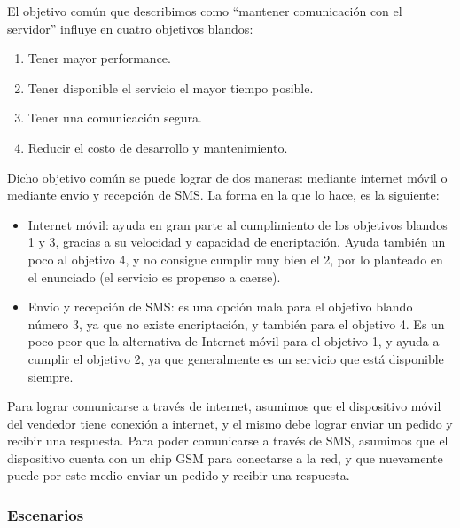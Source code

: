 \indent El objetivo común que describimos como ``mantener comunicación con el servidor'' influye en cuatro objetivos blandos:
\begin{enumerate}
  \item Tener mayor performance.
  \item Tener disponible el servicio el mayor tiempo posible.
  \item Tener una comunicación segura.
  \item Reducir el costo de desarrollo y mantenimiento.
\end{enumerate}

Dicho objetivo común se puede lograr de dos maneras: mediante internet móvil o mediante envío y recepción de SMS. La forma en la que lo hace, es la siguiente:
\begin{itemize}
  \item Internet móvil: ayuda en gran parte al cumplimiento de los objetivos blandos 1 y 3, gracias a su velocidad y capacidad de encriptación. Ayuda también un poco al objetivo 4, y no consigue cumplir muy bien el 2, por lo planteado en el enunciado (el servicio es propenso a caerse).

  \item Envío y recepción de SMS: es una opción mala para el objetivo blando número 3, ya que no existe encriptación, y también para el objetivo 4. Es un poco peor que la alternativa de Internet móvil para el objetivo 1, y ayuda a cumplir el objetivo 2, ya que generalmente es un servicio que está disponible siempre.
\end{itemize}

\indent Para lograr comunicarse a través de internet, asumimos que el dispositivo móvil del vendedor tiene conexión a internet, y el mismo debe lograr enviar un pedido y recibir una respuesta. Para poder comunicarse a través de SMS, asumimos que el dispositivo cuenta con un chip GSM para conectarse a la red, y que nuevamente puede por este medio enviar un pedido y recibir una respuesta.

\subsubsection{Escenarios}

